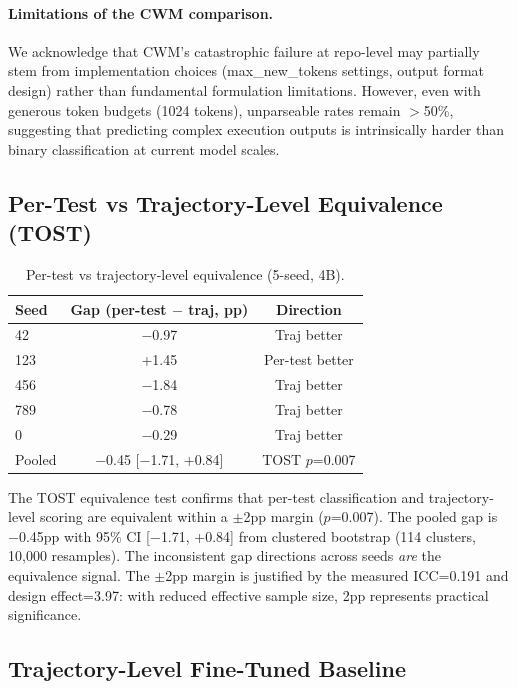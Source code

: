 \documentclass[11pt,a4paper]{article}
\begin{document}
\paragraph{Limitations of the CWM comparison.} We acknowledge that CWM's catastrophic failure at repo-level may partially stem from implementation choices (max\_new\_tokens settings, output format design) rather than fundamental formulation limitations. However, even with generous token budgets (1024 tokens), unparseable rates remain $>$50\%, suggesting that predicting complex execution outputs is intrinsically harder than binary classification at current model scales.

\subsection{Per-Test vs Trajectory-Level Equivalence (TOST)}
\label{sec:tost}

\begin{table}[h]
\centering
\caption{Per-test vs trajectory-level equivalence (5-seed, 4B).}
\label{tab:tost}
\begin{tabular}{lcc}
\toprule
Seed & Gap (per-test $-$ traj, pp) & Direction \\
\midrule
42  & $-$0.97 & Traj better \\
123 & +1.45  & Per-test better \\
456 & $-$1.84 & Traj better \\
789 & $-$0.78 & Traj better \\
0   & $-$0.29 & Traj better \\
\midrule
Pooled & $-$0.45 [$-$1.71, +0.84] & TOST $p$=0.007 \\
\bottomrule
\end{tabular}
\end{table}

The TOST equivalence test confirms that per-test classification and trajectory-level scoring are equivalent within a $\pm$2pp margin ($p$=0.007). The pooled gap is $-$0.45pp with 95\% CI [$-$1.71, +0.84] from clustered bootstrap (114 clusters, 10,000 resamples). The inconsistent gap directions across seeds \emph{are} the equivalence signal. The $\pm$2pp margin is justified by the measured ICC=0.191 and design effect=3.97: with reduced effective sample size, 2pp represents practical significance.

\subsection{Trajectory-Level Fine-Tuned Baseline}
\label{sec:traj}
\end{document}
